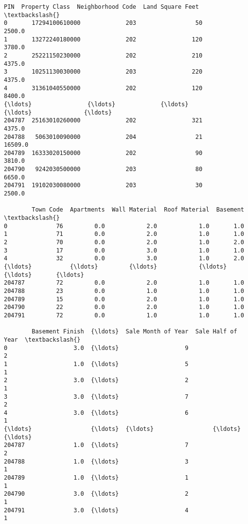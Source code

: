 \documentclass[11pt]{article}
\makeatletter
\newcommand{\boxspacing}{\kern\kvtcb@left@rule\kern\kvtcb@boxsep}
\newcommand{\prompt}[4]{
        {\ttfamily\llap{{\color{#2}[#3]:\hspace{3pt}#4}}\vspace{-\baselineskip}}
    }
\makeatother
\begin{document}
            \begin{tcolorbox}[breakable, size=fbox, boxrule=.5pt, pad at break*=1mm, opacityfill=0]
\prompt{Out}{outcolor}{11}{\boxspacing}
\begin{Verbatim}[commandchars=\\\{\}]
                   PIN  Property Class  Neighborhood Code  Land Square Feet  \textbackslash{}
0       17294100610000             203                 50            2500.0
1       13272240180000             202                120            3780.0
2       25221150230000             202                210            4375.0
3       10251130030000             203                220            4375.0
4       31361040550000             202                120            8400.0
{\ldots}                {\ldots}             {\ldots}                {\ldots}               {\ldots}
204787  25163010260000             202                321            4375.0
204788   5063010090000             204                 21           16509.0
204789  16333020150000             202                 90            3810.0
204790   9242030500000             203                 80            6650.0
204791  19102030080000             203                 30            2500.0

        Town Code  Apartments  Wall Material  Roof Material  Basement  \textbackslash{}
0              76         0.0            2.0            1.0       1.0
1              71         0.0            2.0            1.0       1.0
2              70         0.0            2.0            1.0       2.0
3              17         0.0            3.0            1.0       1.0
4              32         0.0            3.0            1.0       2.0
{\ldots}           {\ldots}         {\ldots}            {\ldots}            {\ldots}       {\ldots}
204787         72         0.0            2.0            1.0       1.0
204788         23         0.0            1.0            1.0       1.0
204789         15         0.0            2.0            1.0       1.0
204790         22         0.0            2.0            1.0       1.0
204791         72         0.0            1.0            1.0       1.0

        Basement Finish  {\ldots}  Sale Month of Year  Sale Half of Year  \textbackslash{}
0                   3.0  {\ldots}                   9                  2
1                   1.0  {\ldots}                   5                  1
2                   3.0  {\ldots}                   2                  1
3                   3.0  {\ldots}                   7                  2
4                   3.0  {\ldots}                   6                  1
{\ldots}                 {\ldots}  {\ldots}                 {\ldots}                {\ldots}
204787              1.0  {\ldots}                   7                  2
204788              1.0  {\ldots}                   3                  1
204789              1.0  {\ldots}                   1                  1
204790              3.0  {\ldots}                   2                  1
204791              3.0  {\ldots}                   4                  1


\end{Verbatim}
\end{tcolorbox}
\end{document}
